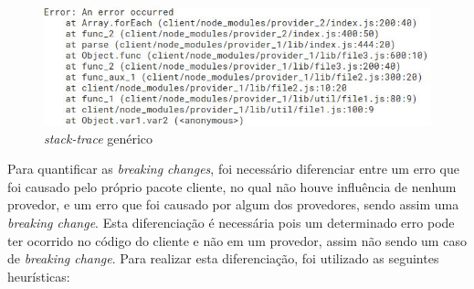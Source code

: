 \begin{figure}
    \centering
    \includegraphics[scale=0.7]{figuras/stack_trace.jpeg}
    \caption{\textit{stack-trace} genérico}
    \label{fig:trace}
\end{figure}{}

Para quantificar as \textit{breaking changes}, foi necessário diferenciar entre um erro que foi causado pelo próprio pacote cliente, no qual não houve influência de nenhum provedor, e um erro que foi causado por algum dos provedores, sendo assim uma \textit{breaking change}. Esta diferenciação é necessária pois um determinado erro pode ter ocorrido no código do cliente e não em um provedor, assim não sendo um caso de \textit{breaking change}. Para realizar esta diferenciação, foi utilizado as seguintes heurísticas:

